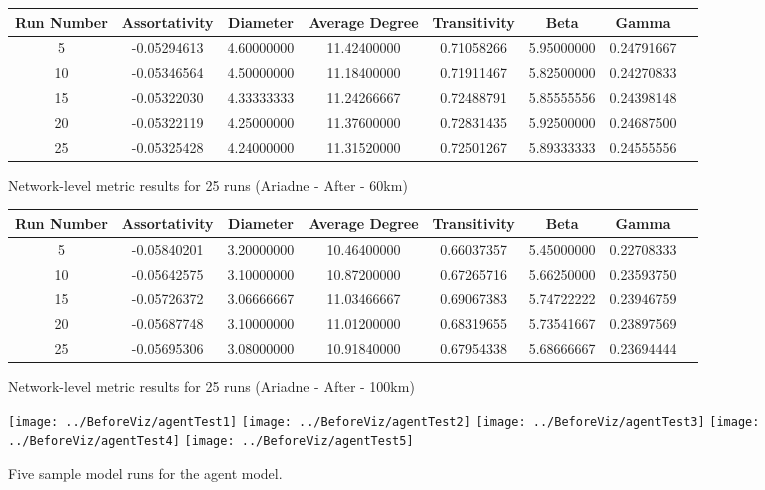 \documentclass[12pt,a4paper]{thesis}
\begin{document}
{\begin{appendices}
\begin{figure}
\centering
\tiny
\begin{tabular}{|c|c|c|c|c|c|c|c|}
\hline Run Number & Assortativity & Diameter & Average Degree & Transitivity & Beta & Gamma \\ 
\hline	5	&	-0.05294613	&	4.60000000	&	11.42400000	&	0.71058266	&	5.95000000	&	0.24791667	\\
\hline	10	&	-0.05346564	&	4.50000000	&	11.18400000	&	0.71911467	&	5.82500000	&	0.24270833	\\
\hline	15	&	-0.05322030	&	4.33333333	&	11.24266667	&	0.72488791	&	5.85555556	&	0.24398148	\\
\hline	20	&	-0.05322119	&	4.25000000	&	11.37600000	&	0.72831435	&	5.92500000	&	0.24687500	\\
\hline	25	&	-0.05325428	&	4.24000000	&	11.31520000	&	0.72501267	&	5.89333333	&	0.24555556	\\
\hline 
\end{tabular}
\caption{Network-level metric results for 25 runs (Ariadne - After - 60km)}
\label{fig:ConvergeAriadneA60} 
\end{figure}

\begin{figure}
\centering
\tiny
\begin{tabular}{|c|c|c|c|c|c|c|c|}
\hline Run Number & Assortativity & Diameter & Average Degree & Transitivity & Beta & Gamma \\ 
\hline	5	&	-0.05840201	&	3.20000000	&	10.46400000	&	0.66037357	&	5.45000000	&	0.22708333	\\
\hline	10	&	-0.05642575	&	3.10000000	&	10.87200000	&	0.67265716	&	5.66250000	&	0.23593750	\\
\hline	15	&	-0.05726372	&	3.06666667	&	11.03466667	&	0.69067383	&	5.74722222	&	0.23946759	\\
\hline	20	&	-0.05687748	&	3.10000000	&	11.01200000	&	0.68319655	&	5.73541667	&	0.23897569	\\
\hline	25	&	-0.05695306	&	3.08000000	&	10.91840000	&	0.67954338	&	5.68666667	&	0.23694444	\\
\hline 
\end{tabular}
\caption{Network-level metric results for 25 runs (Ariadne - After - 100km)}
\label{fig:ConvergeAriadneA100} 
\end{figure}


\begin{figure}
\centering
\texttt{[image: ../BeforeViz/agentTest1]}
\texttt{[image: ../BeforeViz/agentTest2]}
\texttt{[image: ../BeforeViz/agentTest3]}
\texttt{[image: ../BeforeViz/agentTest4]}
\texttt{[image: ../BeforeViz/agentTest5]}
\caption{Five sample model runs for the agent model.}
\label{fig:agentFluctuations}
\end{figure}



\end{appendices}}
\end{document}
